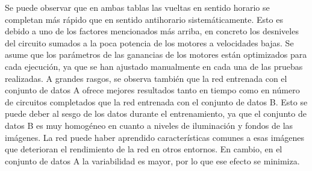 \begin{table}[ht!]
\ttfamily\small
\centering
{}
\caption{Tiempos por vuelta en los 12 circuitos utilizando la red MobileNet-v2* con el conjunto de datos B (los - indican que el modelo no ha conseguido completar una vuelta)}
\label{tab:mbexperimentsB}
\end{table}

Se puede observar que en ambas tablas las vueltas en sentido horario se completan más rápido que en sentido antihorario sistemáticamente. Esto es debido a uno de los factores mencionados más arriba, en concreto los desniveles del circuito sumados a la poca potencia de los motores a velocidades bajas. Se asume que los parámetros de las ganancias de los motores están optimizados para cada ejecución, ya que se han ajustado manualmente en cada una de las pruebas realizadas. A grandes rasgos, se observa también que la red entrenada con el conjunto de datos A ofrece mejores resultados tanto en tiempo como en número de circuitos completados que la red entrenada con el conjunto de datos B. Esto se puede deber al sesgo de los datos durante el entrenamiento, ya que el conjunto de datos B es muy homogéneo en cuanto a niveles de iluminación y fondos de las imágenes. La red puede haber aprendido características comunes a esas imágenes que deterioran el rendimiento de la red en otros entornos. En cambio, en el conjunto de datos A la variabilidad es mayor, por lo que ese efecto se minimiza.


